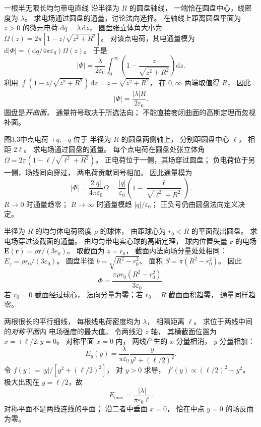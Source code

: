 一根半无限长均匀带电直线
沿半径为 $R$ 的圆盘轴线，
一端恰在圆盘中心，线密度为 $\lambda$。
求电场通过圆盘的通量，讨论法向选择。
\exsolution
在轴线上距离圆盘平面为 $z>0$ 的微元电荷
$\mathrm dq=\lambda\,\mathrm dz$，
圆盘张立体角大小为
$\Omega(z)=2\pi[1-z/\sqrt{z^2+R^2}]$。
对该点电荷，其电通量模为
$\mathrm d|\Phi|=(\mathrm dq/4\pi\varepsilon_0)\Omega(z)$。
于是
\[
|\Phi|=\frac{\lambda}{2\varepsilon_0}
\int_0^\infty
\left(1-\frac z{\sqrt{z^2+R^2}}\right)\mathrm dz.
\]
利用
$\int(1-z/\sqrt{z^2+R^2})\,\mathrm dz
=z-\sqrt{z^2+R^2}$，
在 $0,\infty$ 两端取值得 $R$，
因此
\[
\boxed{|\Phi|=\frac{|\lambda|R}{2\varepsilon_0}}.
\]
\excheck 圆盘是\emph{开曲面}，
通量符号取决于所选法向；
不能直接套闭曲面的高斯定理而忽视补面。

图3.3中点电荷 $+q,-q$ 位于
半径为 $R$ 的圆盘两侧轴上，
分别距圆盘中心 $\ell$，
相距 $2\ell$。
求电场通过圆盘的通量。
\exsolution
每个点电荷在圆盘处张立体角
$\Omega=2\pi(1-\ell/\sqrt{\ell^2+R^2})$。
正电荷位于一侧，其场穿过圆盘；
负电荷位于另一侧，场线同向穿过，
两电荷贡献同号相加。
因此通量模为
\[
|\Phi|=\frac{2|q|}{4\pi\varepsilon_0}\Omega
=\boxed{\frac{|q|}{\varepsilon_0}
\left(1-\frac{\ell}{\sqrt{\ell^2+R^2}}\right)}.
\]
\excheck $R\to0$ 时通量趋零；
$R\to\infty$ 时通量模趋 $|q|/\varepsilon_0$；
正负号仍由圆盘法向定义决定。

半径为 $R$ 的均匀体电荷密度
$\rho$ 的球体，
由距球心为 $r_0<R$ 的平面截出圆盘。
求电场穿过该截面的通量。
\exsolution
由均匀带电实心球的高斯定理，
球内位置矢量 $\bm r$ 的电场
$\bm E(\bm r)=\rho\bm r/(3\varepsilon_0)$。
取截面为 $z=r_0$，
截面内法向场分量处处相同：
$E_z=\rho r_0/(3\varepsilon_0)$。
圆盘半径
$b=\sqrt{R^2-r_0^2}$、
面积 $S=\pi(R^2-r_0^2)$。
因此
\[
\boxed{\Phi=
\frac{\pi\rho r_0(R^2-r_0^2)}{3\varepsilon_0}}.
\]
\excheck 若 $r_0=0$ 截面经过球心，
法向分量为零；若 $r_0=R$ 截面面积趋零，
通量同样趋零。

两根很长的平行细线，
每根线电荷密度均为 $\lambda$，
相隔距离 $\ell$。
求位于两线中间的\emph{对称平面}内
电场强度的最大值。
\exsolution
令两线沿 $z$ 轴，
其横截面位置为
$x=\pm\ell/2,y=0$。
对称平面 $x=0$ 内，
两线产生的 $x$ 分量相消，
$y$ 分量相加：
\[
E_y(y)=
\frac{\lambda}{\pi\varepsilon_0}
\frac{y}{y^2+(\ell/2)^2}.
\]
令
$f(y)=|y|/[y^2+(\ell/2)^2]$，
对 $y>0$ 求导，
$f'(y)\propto(\ell/2)^2-y^2$。
极大出现在 $y=\ell/2$，故
\[
\boxed{E_{\max}=\frac{|\lambda|}{\pi\varepsilon_0\ell}}.
\]
\excheck 对称平面不是两线连线的平面；
沿二者中垂面 $x=0$，
恰在中点 $y=0$ 的场反而为零。

